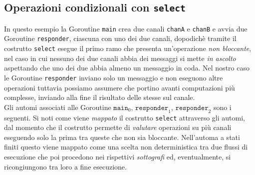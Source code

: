 \subsection{Operazioni condizionali con \texttt{select}}
In questo esempio la Goroutine \texttt{main} crea due canali \texttt{chanA} e \texttt{chanB} e avvia due Goroutine \texttt{responder}, ciascuna con uno dei due canali, dopodichè tramite il costrutto \texttt{select} esegue il primo ramo che presenta un'operazione \emph{non bloccante}, nel caso in cui nessuno dei due canali abbia dei messaggi si mette \emph{in ascolto} aspettando che uno dei due abbia almeno un messaggio in coda. Nel nostro caso le Goroutine \texttt{responder} inviano solo un messaggio e non eseguono altre operazioni tuttavia possiamo assumere che portino avanti computazioni più complesse, inviando alla fine il risultato delle stesse sul canale.\\

Gli automi associati alle Goroutine $\texttt{main}_0$, $\texttt{responder}_1$, $\texttt{responder}_2$ sono i seguenti. Si noti come viene \emph{mappato} il costrutto \texttt{select} attraverso gli automi, dal momento che il costrutto permette di \emph{valutare} operazioni su più canali eseguendo solo la prima tra queste che non sia bloccante. Nell'automa a stati finiti questo viene mappato come una scelta non deterministica tra due flussi di esecuzione che poi procedono nei rispettivi \emph{sottografi} ed, eventualmente, si ricongiungono tra loro a fine esecuzione.\bigskip \\
\begin{figure}[h!]
    \centering
\end{figure}\\
